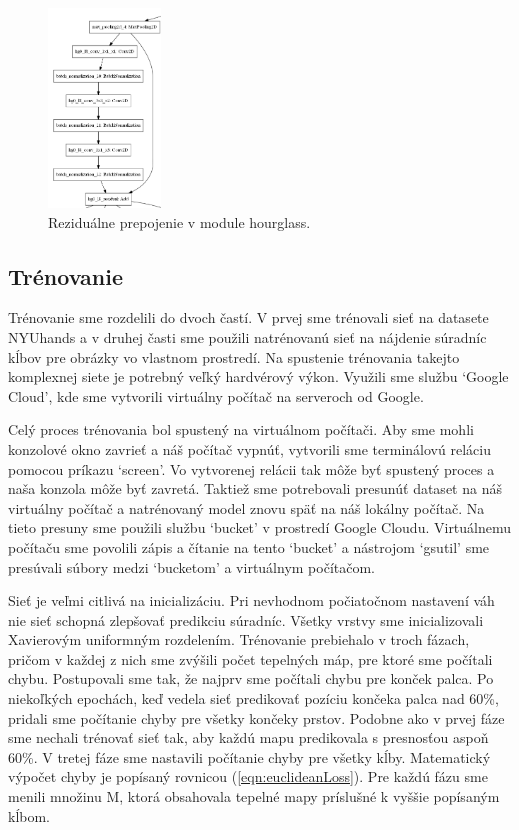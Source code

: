 \begin{figure}[H]
	\begin{center}
		\includegraphics[height=200px]{images/42residual.png}
		\caption{Reziduálne prepojenie v module hourglass.}
		\label{img:42residual}
	\end{center}
\end{figure}

\subsection{Trénovanie}
Trénovanie sme rozdelili do dvoch častí. V prvej sme trénovali sieť na datasete NYUhands a v druhej časti sme použili natrénovanú sieť na nájdenie súradníc kĺbov pre obrázky vo vlastnom prostredí. Na spustenie trénovania takejto komplexnej siete je potrebný veľký hardvérový výkon. Využili sme službu `Google Cloud', kde sme vytvorili virtuálny počítač na serveroch od Google. 

Celý proces trénovania bol spustený na virtuálnom počítači. Aby sme mohli konzolové okno zavrieť a náš počítač vypnúť, vytvorili sme terminálovú reláciu pomocou príkazu `screen'. Vo vytvorenej relácii tak môže byť spustený proces a naša konzola môže byť zavretá. Taktiež sme potrebovali presunúť dataset na náš virtuálny počítač a natrénovaný model znovu späť na náš lokálny počítač. Na tieto presuny sme použili službu `bucket' v prostredí Google Cloudu. Virtuálnemu počítaču sme povolili zápis a čítanie na tento `bucket' a nástrojom `gsutil' sme presúvali súbory medzi `bucketom' a virtuálnym počítačom.

Sieť je veľmi citlivá na inicializáciu. Pri nevhodnom počiatočnom nastavení váh nie sieť schopná zlepšovať predikciu súradníc. Všetky vrstvy sme inicializovali Xavierovým \cite{glorot2010understanding} uniformným rozdelením. Trénovanie prebiehalo v troch fázach, pričom v každej z nich sme zvýšili počet tepelných máp, pre ktoré sme počítali chybu. Postupovali sme tak, že najprv sme počítali chybu pre konček palca. Po niekoľkých epochách, keď vedela sieť predikovať pozíciu končeka palca nad 60\%, pridali sme počítanie chyby pre všetky končeky prstov. Podobne ako v prvej fáze sme nechali trénovať sieť tak, aby každú mapu predikovala s presnosťou aspoň 60\%. V tretej fáze sme nastavili počítanie chyby pre všetky kĺby. Matematický výpočet chyby je popísaný rovnicou (\ref{eqn:euclideanLoss}). Pre každú fázu sme menili množinu M, ktorá obsahovala tepelné mapy príslušné k vyššie popísaným kĺbom. 

